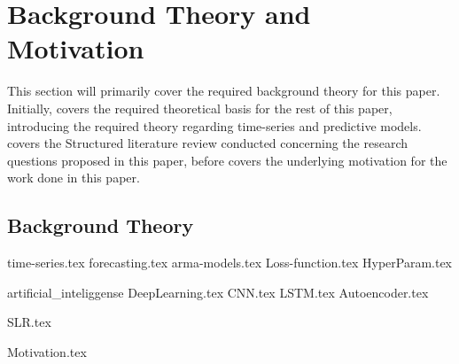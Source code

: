 \chapter{Background Theory and Motivation}\label{T-B}
\label{cha:TheoryAndBackground}


This section will primarily cover the required background theory for this paper.
Initially,  covers the required theoretical basis for the rest of this paper,
introducing the required theory regarding time-series and predictive models.
 covers the Structured literature review conducted concerning the research questions proposed in this paper,
before  covers the underlying motivation for the work done in this paper.



\section{Background Theory}
\label{section:BT:BackgroundTheory}
{time-series.tex}
{forecasting.tex}
{arma-models.tex}
{Loss-function.tex}
{HyperParam.tex}

{artificial_inteliggense}
{DeepLearning.tex}
{CNN.tex}
{LSTM.tex}
{Autoencoder.tex}



{SLR.tex}


{Motivation.tex}
